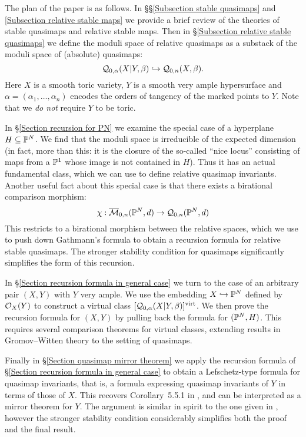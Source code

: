 The plan of the paper is as follows. In \S\S \ref{Subsection stable quasimaps} and \ref{Subsection relative stable maps} we provide a brief review of the theories of stable quasimaps and relative stable maps. Then in \S \ref{Subsection relative stable quasimaps} we define the moduli space of relative quasimaps as a substack of the moduli space of (absolute) quasimaps:
\begin{equation*} \mathcal{Q}_{0,\alpha}(X|Y,\beta) \hookrightarrow \mathcal{Q}_{0,n}(X,\beta). \end{equation*}
Here $X$ is a smooth toric variety, $Y$ is a smooth very ample hypersurface and $\alpha = (\alpha_1, \ldots, \alpha_n)$ encodes the orders of tangency of the marked points to $Y$. Note that we \emph{do not} require $Y$ to be toric.

In \S \ref{Section recursion for PN} we examine the special case of a hyperplane $H \subseteq \mathbb P^N$. We find that the moduli space is irreducible of the expected dimension (in fact, more than this: it is the closure of the so-called ``nice locus'' consisting of maps from a $\mathbb P^1$ whose image is not contained in $H$). Thus it has an actual fundamental class, which we can use to define relative quasimap invariants.
Another useful fact about this special case is that there exists a birational comparison morphism:
\begin{equation*} \chi : \overline{\mathcal{M}}_{0,n}(\mathbb P^N,d) \rightarrow \mathcal{Q}_{0,n}(\mathbb P^N,d) \end{equation*} 
This restricts to a birational morphism between the relative spaces, which we use to push down Gathmann's formula to obtain a recursion formula for relative stable quasimaps. The stronger stability condition for quasimaps significantly simplifies the form of this recursion.

In \S \ref{Section recursion formula in general case} we turn to the case of an arbitrary pair $(X,Y)$ with $Y$ very ample. We use the embedding $X \hookrightarrow \mathbb P^N$ defined by $\mathcal{O}_X(Y)$ to construct a virtual class $[\mathcal{Q}_{0,\alpha}(X|Y,\beta)]^{\operatorname{virt}}$.
We then prove the recursion formula for $(X,Y)$ by pulling back the formula for $(\mathbb P^N,H)$. This requires several comparison theorems for virtual classes, extending results in Gromov--Witten theory to the setting of quasimaps.

Finally in \S \ref{Section quasimap mirror theorem} we apply the recursion formula of \S \ref{Section recursion formula in general case} to obtain a Lefschetz-type formula for quasimap invariants, that is, a formula expressing quasimap invariants of $Y$ in terms of those of $X$. This recovers Corollary~5.5.1 in \cite{CF-K-wallcrossing}, and can be interpreted as a mirror theorem for $Y$. The argument is similar in spirit to the one given in \cite{Ga-MF}, however the stronger stability condition considerably simplifies both the proof and the final result.

